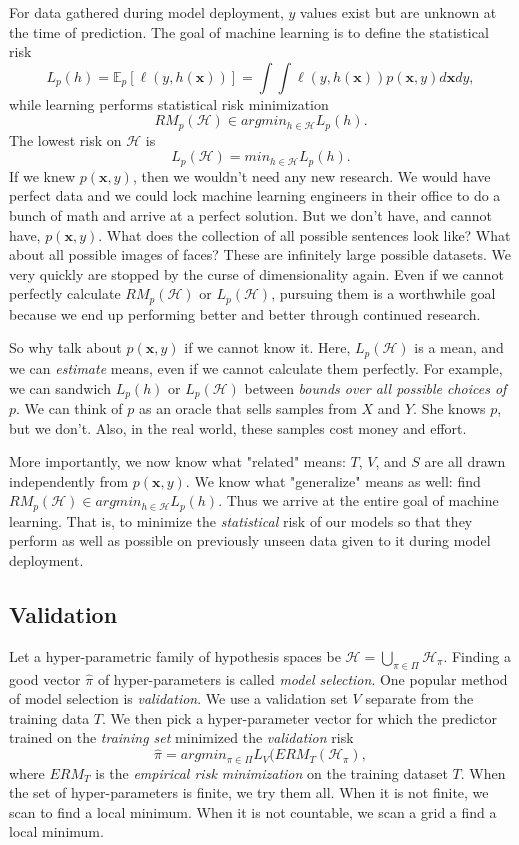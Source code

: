 \documentclass[titlepage, 12pt, leqno]{article}
\begin{document}
For data gathered during model deployment, $y$ values exist but are unknown at
the time of prediction. The goal of machine learning is to define the 
statistical risk 
\[
    L_{p}(h) = \mathbb{E}_{p}[\ell(y, h(\textbf{x}))] =
    \int \int \ell(y, h(\textbf{x}))p(\textbf{x},y)d \textbf{x} dy,
\]
while learning performs statistical risk minimization
\[
    RM_{p}( \mathcal{H}) \in argmin_{h \in \mathcal{H}}L_{p}(h).
\]
The lowest risk on $ \mathcal{H}$ is
\[
    L_{p}(\mathcal{H}) = min_{h \in \mathcal{H}}L_{p}(h).
\]
If we knew $p(\textbf{x}, y)$, then we wouldn't need any new research. We would
have perfect data and we could lock machine learning engineers in their office
to do a bunch of math and arrive at a perfect solution. But we don't have, and
cannot have, $p(\textbf{x}, y)$. What does the collection of all possible
sentences look like? What about all possible images of faces? These are
infinitely large possible datasets. We very quickly are stopped by the curse of
dimensionality again. Even if we cannot perfectly calculate $RM_{p}(
\mathcal{H})$ or $L_{p}( \mathcal{H})$, pursuing them is a worthwhile goal 
because we end up performing better and better through continued research.

So why talk about $p(\textbf{x}, y)$ if we cannot know it. Here,
$L_{p}(\mathcal{H})$ is a mean, and we can \textit{estimate} means, even if we
cannot calculate them perfectly. For example, we can sandwich $L_{p}(
h)$ or $L_{p}( \mathcal{H})$ between \textit{bounds over all possible
choices of $p$}. We can think of $p$ as an oracle that sells samples from
$X$ and $Y$. She knows $p$, but we don't. Also, in the real world, these
samples cost money and effort.

More importantly, we now know what "related" means: $T$, $V$, and $S$ are all
drawn independently from $p(\textbf{x}, y)$. We know what "generalize" means
as well: find $RM_{p}(\mathcal{H}) \in argmin_{h \in \mathcal{H}}L_{p}(h)$. Thus
we arrive at the entire goal of machine learning. That is, to minimize the
\textit{statistical} risk of our models so that they perform as well as possible
on previously unseen data given to it during model deployment.

\subsection{Validation}
Let a hyper-parametric family of hypothesis spaces be $ \mathcal{H} =
\bigcup_{\pi \in \Pi} \mathcal{H}_{\pi}$. Finding a good vector 
$\hat \pi$ of hyper-parameters is called \textit{model selection}. One 
popular method of model selection is \textit{validation}. We use a validation
set $V$ separate from the training data $T$. We then pick a hyper-parameter
vector for which the predictor trained on the \textit{training set} minimized
the \textit{validation} risk
\[
\hat \pi = argmin_{\pi \in \Pi}L_{V}(ERM_{T}( \mathcal{H}_{\pi}),
\]
where $ERM_{T}$ is the \textit{empirical risk minimization} on the training 
dataset $T$. When the set of hyper-parameters is finite, we try them all. When
it is not finite, we scan to find a local minimum. When it is not countable,
we scan a grid a find a local minimum.
\end{document}
